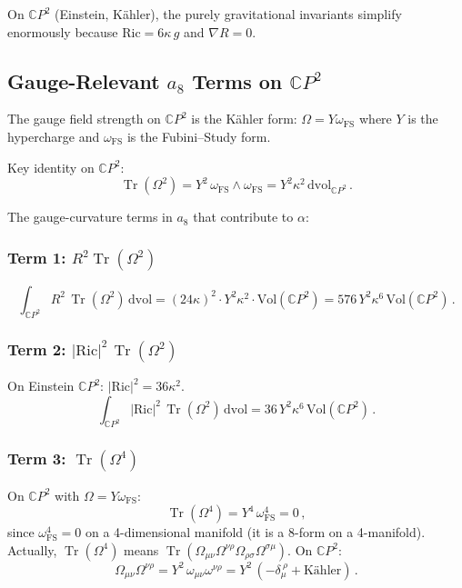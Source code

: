 \documentclass[11pt,a4paper]{article}
\newcommand{\Tr}{\operatorname{Tr}}
\newcommand{\CP}{\mathbb{C}P}
\begin{document}
On $\CP^2$ (Einstein, K\"ahler), the purely gravitational invariants simplify enormously because $\mathrm{Ric} = 6\kappa\,g$ and $\nabla R = 0$.

\subsection{Gauge-Relevant $a_8$ Terms on $\CP^2$}

The gauge field strength on $\CP^2$ is the K\"ahler form: $\Omega = Y\omega_{\mathrm{FS}}$ where $Y$ is the hypercharge and $\omega_{\mathrm{FS}}$ is the Fubini--Study form.

Key identity on $\CP^2$:
\begin{equation}
\Tr(\Omega^2) = Y^2\,\omega_{\mathrm{FS}} \wedge \omega_{\mathrm{FS}} = Y^2\kappa^2\,\mathrm{dvol}_{\CP^2}\,.
\end{equation}

The gauge-curvature terms in $a_8$ that contribute to $\alpha$:

\subsubsection{Term 1: $R^2\Tr(\Omega^2)$}

\begin{equation}
\int_{\CP^2} R^2\,\Tr(\Omega^2)\,\mathrm{dvol} = (24\kappa)^2 \cdot Y^2\kappa^2 \cdot \mathrm{Vol}(\CP^2) = 576\,Y^2\kappa^6\,\mathrm{Vol}(\CP^2)\,.
\end{equation}

\subsubsection{Term 2: $|\mathrm{Ric}|^2\,\Tr(\Omega^2)$}

On Einstein $\CP^2$: $|\mathrm{Ric}|^2 = 36\kappa^2$.
\begin{equation}
\int_{\CP^2}|\mathrm{Ric}|^2\,\Tr(\Omega^2)\,\mathrm{dvol} = 36\,Y^2\kappa^6\,\mathrm{Vol}(\CP^2)\,.
\end{equation}

\subsubsection{Term 3: $\Tr(\Omega^4)$}

On $\CP^2$ with $\Omega = Y\omega_{\mathrm{FS}}$:
\begin{equation}
\Tr(\Omega^4) = Y^4\,\omega_{\mathrm{FS}}^4 = 0\,,
\end{equation}
since $\omega_{\mathrm{FS}}^4 = 0$ on a 4-dimensional manifold (it is a 8-form on a 4-manifold). Actually, $\Tr(\Omega^4)$ means $\Tr(\Omega_{\mu\nu}\Omega^{\nu\rho}\Omega_{\rho\sigma}\Omega^{\sigma\mu})$. On $\CP^2$:
\begin{equation}
\Omega_{\mu\nu}\Omega^{\nu\rho} = Y^2\,\omega_{\mu\nu}\omega^{\nu\rho} = Y^2\,(-\delta_\mu^{\ \rho} + \text{K\"ahler})\,.
\end{equation}
\end{document}
